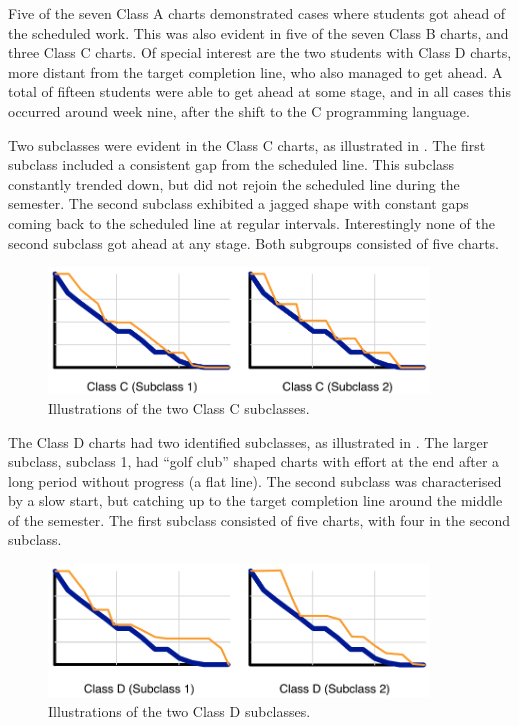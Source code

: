 Five of the seven Class A charts demonstrated cases where students got ahead of the scheduled work. This was also evident in five of the seven Class B charts, and three Class C charts. Of special interest are the two students with Class D charts, more distant from the target completion line, who also managed to get ahead. A total of fifteen students were able to get ahead at some stage, and in all cases this occurred around week nine, after the shift to the C programming language. 

Two subclasses were evident in the Class C charts, as illustrated in . The first subclass included a consistent gap from the scheduled line. This subclass constantly trended down, but did not rejoin the scheduled line during the semester. The second subclass exhibited a jagged shape with constant gaps coming back to the scheduled line at regular intervals. Interestingly none of the second subclass got ahead at any stage. Both subgroups consisted of five charts.

\begin{figure}[htbp]
  \centering
  \includegraphics[width=0.9\textwidth]{ChartCSubclass}
  \caption{Illustrations of the two Class C subclasses.}
  \label{fig:c_subclass}
\end{figure}

The Class D charts had two identified subclasses, as illustrated in . The larger subclass, subclass 1, had ``golf club'' shaped charts with effort at the end after a long period without progress (a flat line). The second subclass was characterised by a slow start, but catching up to the target completion line around the middle of the semester. The first subclass consisted of five charts, with four in the second subclass.

\begin{figure}[htbp]
  \centering
  \includegraphics[width=0.9\textwidth]{ChartDSubclass}
  \caption{Illustrations of the two Class D subclasses.}
  \label{fig:d_subclass}
\end{figure}

